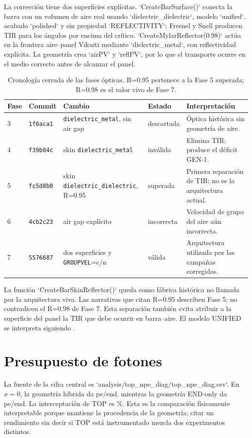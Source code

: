 La corrección tiene dos superficies explícitas. `CreateBarSurface()` conecta la barra con un volumen de aire real usando `dielectric\_dielectric`, modelo `unified`, acabado `polished` y sin propiedad `REFLECTIVITY`; Fresnel y Snell producen TIR para los ángulos por encima del crítico. `CreateMylarReflector(0.98)` actúa en la frontera aire--panel Vikuiti mediante `dielectric\_metal`, con reflectividad explícita. La geometría crea `airPV` y `reflPV`, por lo que el transporte ocurre en el medio correcto antes de alcanzar el panel.

\begin{table}[htbp]\centering
\caption{Cronología cerrada de las fases ópticas. R=0.95 pertenece a la Fase 5 superada; R=0.98 es el valor vivo de Fase 7.}
\begin{tabular}{llllp{}}\toprule
Fase & Commit & Cambio & Estado & Interpretación\\\midrule
3 & \texttt{1f6aca1} & \texttt{dielectric\_metal}, sin air gap & descartada & Óptica histórica sin geometría de aire.\\
4 & \texttt{f39b84c} & skin \texttt{dielectric\_metal} & inválida & Elimina TIR; produce el déficit GEN-1.\\
5 & \texttt{fc5d8b0} & skin \texttt{dielectric\_dielectric}, R=0.95 & superada & Primera reparación de TIR; no es la arquitectura actual.\\
6 & \texttt{4cb2c23} & air gap explícito & incorrecta & Velocidad de grupo del aire aún incorrecta.\\
7 & \texttt{5576687} & dos superficies y \texttt{GROUPVEL}=c/n & válida & Arquitectura utilizada por las campañas corregidas.\\\bottomrule
\end{tabular}\end{table}

La función `CreateBarSkinReflector()` queda como fábrica histórica no llamada por la arquitectura viva. Las narrativas que citan R=0.95 describen Fase 5; no contradicen el R=0.98 de Fase 7. Esta separación también evita atribuir a la superficie del panel la TIR que debe ocurrir en barra--aire. El modelo UNIFIED se interpreta siguiendo \cite{Levin1996}.


\chapter{Presupuesto de fotones}
La fuente de la cifra central es `analysis/top\_npe\_diag/top\_npe\_diag.csv`. En $x=0$, la geometría híbrida da \HybridNpePerEnd{} pe/end, mientras la geometría END-only da \EndOnlyNpePerEnd{} pe/end. La interceptación de TOP es \TopInterceptedPct\%. Esta es la comparación físicamente interpretable porque mantiene la procedencia de la geometría; citar un rendimiento sin decir si TOP está instrumentado mezcla dos experimentos distintos.

